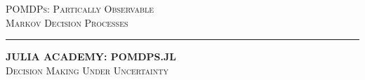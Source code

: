 
\begin{frame}[plain,c]{}

\begin{center}
\Large \textsc{POMDPs: Partically Observable\\Markov Decision Processes}
\textcolor[RGB]{100,100,100}{\rule{\linewidth}{0.2pt}}

{\color{cardinal}\textbf{\Large{J}\normalsize{ULIA} \Large{A}\normalsize{CADEMY}: \Large{POMDP}\normalsize{S.JL}}}\\
{\normalsize\textsc{Decision Making Under Uncertainty}}

\end{center}

\end{frame}


